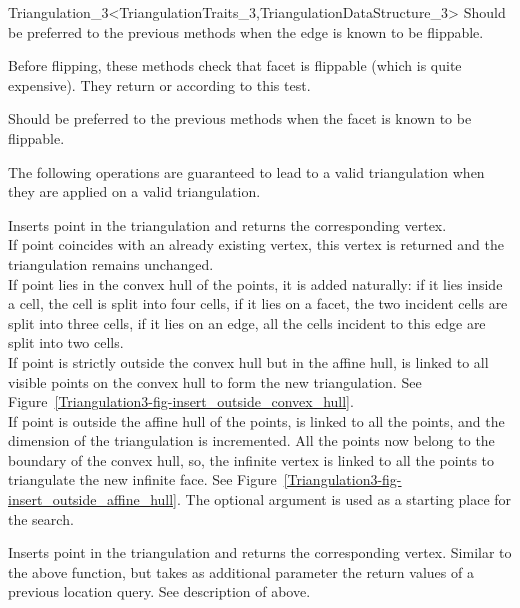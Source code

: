 \begin{ccRefClass}{Triangulation_3<TriangulationTraits_3,TriangulationDataStructure_3>}
\ccGlue
{}
{Should be preferred to the previous methods when the edge is
known to be flippable.
}

\ccGlue
{}
{Before flipping, these methods check that facet  is
flippable (which is quite expensive). They return  or
 according to this test.} 

\ccGlue
{}
{Should be preferred to the previous methods when the facet is
known to be flippable.
}


The following operations are guaranteed to lead to a valid triangulation 
when they are applied on a valid triangulation.

{Inserts point  in the triangulation and returns the corresponding
 vertex.\\
If point  coincides with an already existing vertex, this 
vertex is returned and the triangulation remains unchanged.\\
If point  lies in the convex hull of the points, it is added
naturally: if it lies inside a cell, the cell is split into four
cells, if it lies on a facet, the two incident cells are split into
three cells, if it lies on an edge, all the cells incident to this
edge are split into two cells.\\
If point  is strictly outside the convex hull but in the affine
hull,  is linked to all visible points on the convex hull to
form the new triangulation. See
Figure~\ref{Triangulation3-fig-insert_outside_convex_hull}.\\  
If point  is outside the affine hull of the points,  is
linked to all the points, and the dimension of the triangulation is
incremented. All the points now belong to the boundary of the convex
hull, so, the infinite vertex is linked to all the points to
triangulate the new infinite face. See 
Figure~\ref{Triangulation3-fig-insert_outside_affine_hull}.
The optional argument  is used as a starting place for the search.}

{Inserts point  in the triangulation and returns the corresponding
 vertex. Similar to the above  function, but takes as additional
 parameter the return values of a previous location query.  See description of
  above.}


\end{ccRefClass}
